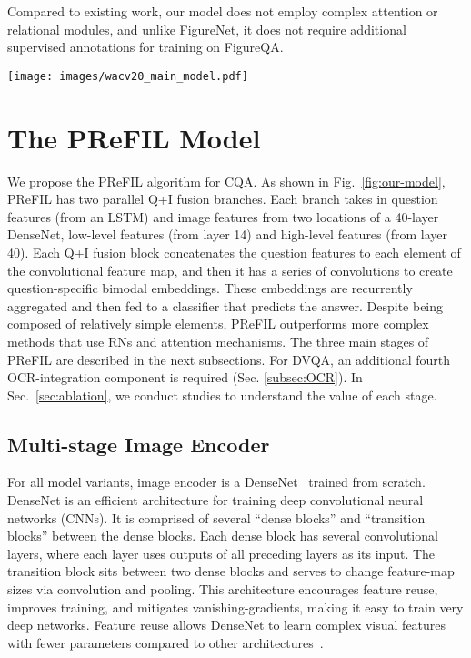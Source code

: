 \documentclass[10pt,twocolumn]{article}
\begin{document}
Compared to existing work, our model does not employ complex attention or relational modules, and unlike FigureNet, it does not require additional supervised annotations for training on FigureQA.

\begin{figure*}
    \centering
    \texttt{[image: images/wacv20\_main\_model.pdf]}
    \caption{Components of our PReFIL model. Magnified views show the details of each dense block and Q+I fusion block. \label{fig:our-model}}
\end{figure*}

\section{The PReFIL Model}\label{sec:PReFIL}

We propose the PReFIL algorithm for CQA. As shown in Fig.~\ref{fig:our-model}, PReFIL has two parallel Q+I fusion branches. Each branch takes in question features (from an LSTM) and image features from two locations of a 40-layer DenseNet, \ie low-level features (from layer 14) and high-level features (from layer 40). Each Q+I fusion block concatenates the question features to each element of the convolutional feature map, and then it has a series of  convolutions to create question-specific bimodal embeddings. These embeddings are recurrently aggregated and then fed to a classifier that predicts the answer. Despite being composed of relatively simple elements, PReFIL outperforms more complex methods that use RNs and attention mechanisms. The three main stages of PReFIL are  described in the next subsections. For DVQA, an additional fourth OCR-integration component is required (Sec. \ref{subsec:OCR}). In Sec.~\ref{sec:ablation}, we conduct studies to understand the value of each stage.

\subsection{Multi-stage Image Encoder}
For all model variants, image encoder is a DenseNet~\cite{huang2017densely} trained from scratch. DenseNet is an efficient architecture for training deep convolutional neural networks (CNNs). It is comprised of several ``dense blocks'' and ``transition blocks'' between the dense blocks. Each dense block has several convolutional layers, where each layer uses outputs of all preceding layers as its input. The transition block sits between two dense blocks and serves to change feature-map sizes via convolution and pooling. This architecture encourages feature reuse, improves training, and mitigates vanishing-gradients, making it easy to train very deep networks. Feature reuse allows DenseNet to learn complex visual features with fewer parameters compared to other architectures~\cite{huang2017condensenet}.
\end{document}
